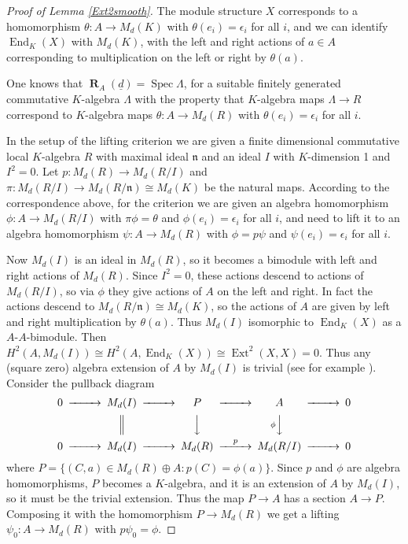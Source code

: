 \documentclass[11pt,a4paper]{amsart}
\theoremstyle{plain}
\theoremstyle{definition}
\begin{document}
\begin{proof}[Proof of Lemma \ref{Ext2smooth}]
The module structure $X$ corresponds to a homomorphism $\theta\colon A \to M_d(K)$
with $\theta(e_i) = \epsilon_i$ for all $i$,
and we can identify $\operatorname{End}_K(X)$ with $M_d(K)$, with the left and right actions of 
$a\in A$ corresponding to multiplication on the left or right by $\theta(a)$.

One knows that ${\operatorname{\mathbf{R}}_A(\underline{d})} = \operatorname{Spec} \Lambda$, for a suitable finitely generated commutative $K$-algebra $\Lambda$ with the property that 
$K$-algebra maps $\Lambda\to R$ correspond to $K$-algebra maps $\theta:A \to M_d(R)$
with $\theta(e_i)=\epsilon_i$ for all $i$.

In the setup of the lifting criterion we are given a finite dimensional commutative local $K$-algebra $R$
with maximal ideal ${\mathfrak{n}}$ and an ideal $I$ with $K$-dimension 1 and $I^2=0$.
Let $p:M_d(R)\to M_d(R/I)$ and $\pi:M_d(R/I) \to M_d(R/{\mathfrak{n}}) \cong M_d(K)$
be the natural maps.
According to the correspondence above, for the criterion we are
given an algebra homomorphism $\phi:A \to M_d(R/I)$ with $\pi \phi = \theta$ and
$\phi(e_i)=\epsilon_i$ for all $i$, and need to lift it to an algebra homomorphism $\psi:A\to M_d(R)$
with $\phi = p\psi$ and $\psi(e_i)=\epsilon_i$ for all $i$.

Now $M_d(I)$ is an ideal in $M_d(R)$, so it becomes a bimodule with left and right actions of $M_d(R)$.
Since $I^2=0$, these actions descend to actions of $M_d(R/I)$, so via $\phi$ they give actions of $A$ on the left and right.
In fact the actions descend to $M_d(R/{\mathfrak{n}}) \cong M_d(K)$, so the actions of $A$ are given by left and
right multiplication by $\theta(a)$.
Thus $M_d(I)$ isomorphic to $\operatorname{End}_K(X)$ as a $A$-$A$-bimodule.
Then $H^2(A,M_d(I)) \cong H^2(A,\operatorname{End}_K(X)) \cong \operatorname{Ext}^2(X,X) = 0$.
Thus any (square zero) algebra extension of $A$ by $M_d(I)$ is trivial
(see for example \cite[\S 9.3]{Weib}).
Consider the pullback diagram
\[
\begin{CD}
0 @>>> M_d(I) @>>> P @>>> A @>>> 0 \\
& & @| @VVV @V\phi VV \\
0 @>>> M_d(I) @>>> M_d(R) @>p >> M_d(R/I) @>>> 0
\end{CD}
\]
where $P = \{ (C,a) \in M_d(R)\oplus A \colon  p(C) = \phi(a) \}$.
Since $p$ and $\phi$ are algebra homomorphisms, $P$ becomes a $K$-algebra, and it is an
extension of $A$ by $M_d(I)$, so it must be the  trivial extension.
Thus the map $P \to A$ has a section $A \to P$. 
Composing it with the homomorphism $P \to M_d(R)$ we get a lifting $\psi_0:A \to M_d(R)$
with $p\psi_0 = \phi$.


\end{proof}
\end{document}
